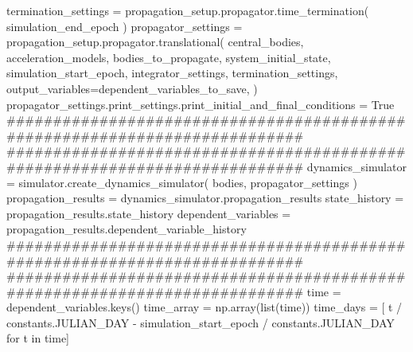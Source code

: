 {}
\markdownRendererSectionEnd \markdownRendererSectionBegin
{}\markdownRendererInterblockSeparator
{}termination_settings = propagation_setup.propagator.time_termination( simulation_end_epoch ) propagator_settings = propagation_setup.propagator.translational( central_bodies, acceleration_models, bodies_to_propagate, system_initial_state, simulation_start_epoch, integrator_settings, termination_settings, output_variables=dependent_variables_to_save, ) propagator_settings.print_settings.print_initial_and_final_conditions = True\markdownRendererInterblockSeparator
{}###########################################################################\markdownRendererInterblockSeparator
{}
\markdownRendererSectionEnd \markdownRendererSectionBegin
{}\markdownRendererInterblockSeparator
{}###########################################################################\markdownRendererInterblockSeparator
{}
\markdownRendererSectionEnd \markdownRendererSectionBegin
{}\markdownRendererInterblockSeparator
{}dynamics_simulator = simulator.create_dynamics_simulator( bodies, propagator_settings )\markdownRendererInterblockSeparator
{}
\markdownRendererSectionEnd \markdownRendererSectionBegin
{}\markdownRendererInterblockSeparator
{}propagation_results = dynamics_simulator.propagation_results\markdownRendererInterblockSeparator
{}
\markdownRendererSectionEnd \markdownRendererSectionBegin
{}\markdownRendererInterblockSeparator
{}state_history = propagation_results.state_history dependent_variables = propagation_results.dependent_variable_history\markdownRendererInterblockSeparator
{}###########################################################################\markdownRendererInterblockSeparator
{}
\markdownRendererSectionEnd \markdownRendererSectionBegin
{}\markdownRendererInterblockSeparator
{}########################################################################### time = dependent_variables.keys() time_array = np.array(list(time)) time_days = [ t / constants.JULIAN_DAY - simulation_start_epoch / constants.JULIAN_DAY for t in time]\markdownRendererInterblockSeparator
{}
\markdownRendererSectionEnd \markdownRendererSectionBegin
{}\markdownRendererInterblockSeparator
